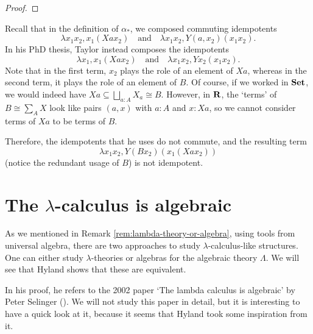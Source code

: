 \begin{proof}
\end{proof}

\begin{remark}
  Recall that in the definition of $ \alpha_* $, we composed commuting idempotents
  \[ \lambda x_1 x_2, x_1 (X a x_2) \quad \text{and} \quad \lambda x_1 x_2, Y (a, x_2) (x_1 x_2). \]
  In his PhD thesis, Taylor instead composes the idempotents
  \[ \lambda x_1, x_1 (X a x_2) \quad \text{and} \quad \lambda x_1 x_2, Y x_2 (x_1 x_2). \]
  Note that in the first term, $ x_2 $ plays the role of an element of $ X a $, whereas in the second term, it plays the role of an element of $ B $. Of course, if we worked in $ \mathbf{Set} $, we would indeed have $ X a \subseteq \bigsqcup_{a : A} X_a \cong B $. However, in $ \mathbf{R} $, the `terms' of $ B \cong \sum_A X $ look like pairs $ (a, x) $ with $ a : A $ and $ x : X a $, so we cannot consider terms of $ X a $ to be terms of $ B $.

  Therefore, the idempotents that he uses do not commute, and the resulting term
  \[ \lambda x_1 x_2, Y (B x_2) (x_1 (X a x_2)) \]
  (notice the redundant usage of $ B $) is not idempotent.
\end{remark}

\section{The \texorpdfstring{$ \lambda $}{lambda}-calculus is algebraic}
As we mentioned in Remark \ref{rem:lambda-theory-or-algebra}, using tools from universal algebra, there are two approaches to study $ \lambda $-calculus-like structures. One can either study $ \lambda $-theories or algebras for the algebraic theory $ \Lambda $. We will see that Hyland shows that these are equivalent.

In his proof, he refers to the 2002 paper `The lambda calculus is algebraic' by Peter Selinger (\autocite{selinger-lambda-calculus-algebraic}). We will not study this paper in detail, but it is interesting to have a quick look at it, because it seems that Hyland took some inspiration from it.


